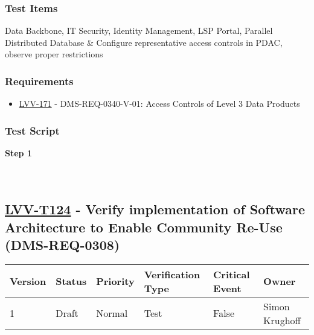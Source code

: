 \hypertarget{test-items-23}{%
\subsubsection{Test Items}\label{test-items-23}}

Data Backbone, IT Security, Identity Management, LSP Portal, Parallel
Distributed Database \& Configure representative access controls in
PDAC, observe proper restrictions

\hypertarget{requirements-23}{%
\subsubsection{Requirements}\label{requirements-23}}

\begin{itemize}
\tightlist
\item
  \href{https://jira.lsstcorp.org/browse/LVV-171}{LVV-171} -
  DMS-REQ-0340-V-01: Access Controls of Level 3 Data Products
\end{itemize}

\hypertarget{test-script-23}{%
\subsubsection{Test Script}\label{test-script-23}}

\textbf{Step 1}\\
~\\
~\\

\hypertarget{lvv-t124---verify-implementation-of-software-architecture-to-enable-community-re-use-dms-req-0308}{%
\subsection{\texorpdfstring{\href{https://jira.lsstcorp.org/secure/Tests.jspa\#/testCase/LVV-T124}{LVV-T124}
- Verify implementation of Software Architecture to Enable Community
Re-Use
(DMS-REQ-0308)}{LVV-T124 - Verify implementation of Software Architecture to Enable Community Re-Use (DMS-REQ-0308)}}\label{lvv-t124---verify-implementation-of-software-architecture-to-enable-community-re-use-dms-req-0308}}

\begin{longtable}[]{@{}llllll@{}}
\toprule
Version & Status & Priority & Verification Type & Critical Event &
Owner\tabularnewline
\midrule
\endhead
1 & Draft & Normal & Test & False & Simon Krughoff\tabularnewline
\bottomrule
\end{longtable}

